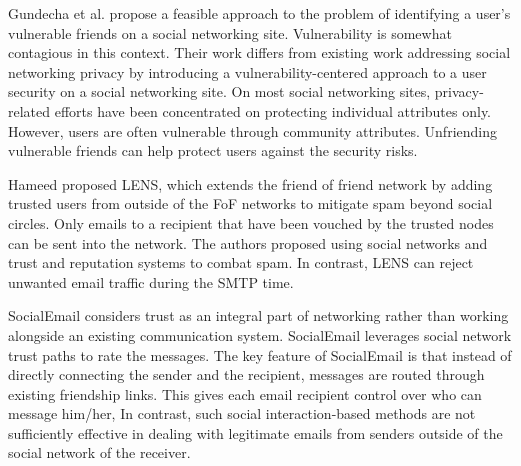 Gundecha et al. \cite{gundecha_exploiting_2011} propose a feasible approach to the problem of identifying a user’s vulnerable friends on a social networking site.
Vulnerability is somewhat contagious in this context.
Their work differs from existing work addressing social networking privacy by introducing a vulnerability-centered approach to a user security on a social networking site.
On most social networking sites,
	privacy-related efforts have been concentrated on protecting individual attributes only.
However,
	users are often vulnerable through community attributes.
Unfriending vulnerable friends can help protect users against the security risks.



Hameed \cite{hameed_lens_2011} proposed LENS,
	which extends the friend of friend network by adding trusted users from outside of the FoF networks to mitigate spam beyond social circles.
Only emails to a recipient that have been vouched by the trusted nodes can be sent into the network.
The authors proposed using social networks and trust and reputation systems to combat spam.
In contrast,
	LENS can reject unwanted email traffic during the SMTP time.

SocialEmail \cite{tran_social_2010} considers trust as an integral part of networking rather than working alongside an existing communication system.
SocialEmail leverages social network trust paths to rate the messages.
The key feature of SocialEmail is that instead of directly connecting the sender and the recipient,
	messages are routed through existing friendship links.
This gives each email recipient control over who can message him/her,
In contrast,
	such social interaction-based methods are not sufficiently effective in dealing with legitimate emails from senders outside of the social network of the receiver.

